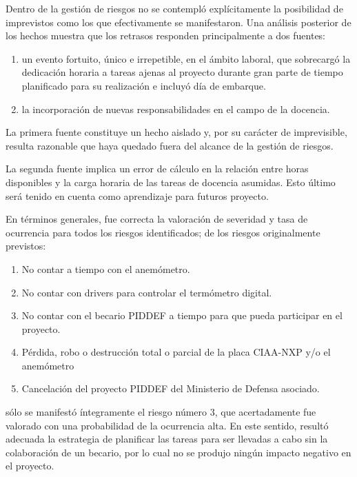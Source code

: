 
Dentro de la gestión de riesgos no se contempló explícitamente la posibilidad de imprevistos como los que efectivamente se manifestaron.  Una análisis posterior de los hechos muestra que los retrasos responden principalmente a dos fuentes:

\begin{enumerate}
	\item un evento fortuito, único e irrepetible, en el ámbito laboral, que sobrecargó la dedicación horaria a tareas ajenas al proyecto durante gran parte de tiempo planificado para su realización e incluyó día de embarque.
	\item la incorporación de nuevas responsabilidades en el campo de la docencia.
\end{enumerate}

La primera fuente constituye un hecho aislado y, por su carácter de imprevisible, resulta razonable que haya quedado fuera del alcance de la gestión de riesgos.  

La segunda fuente implica un error de cálculo en la relación entre horas disponibles y la carga horaria de las tareas de docencia asumidas.  Esto último será tenido en cuenta como aprendizaje para futuros proyecto.

En términos generales, fue correcta la valoración de severidad y tasa de ocurrencia para todos los riesgos identificados; de los riesgos originalmente previstos:

\begin{enumerate}
	\item No contar a tiempo con el anemómetro.
	\item No contar con drivers para controlar el termómetro digital.
	\item No contar con el becario PIDDEF a tiempo para que pueda participar en el proyecto.
	\item Pérdida, robo o destrucción total o parcial de la placa CIAA-NXP y/o el anemómetro
	\item Cancelación del proyecto PIDDEF del Ministerio de Defensa asociado.
\end{enumerate}

\noindent sólo se manifestó íntegramente el riesgo número 3, que acertadamente fue valorado con una probabilidad de la ocurrencia alta. En este sentido, resultó adecuada la estrategia de planificar las tareas para ser llevadas a cabo sin la colaboración de un becario, por lo cual no se produjo ningún impacto negativo en el proyecto. 

